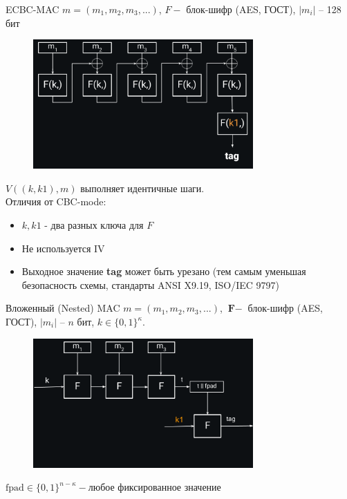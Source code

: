 \documentclass[usenames,dvipsnames,8pt,aspectratio=169]{beamer}
\begin{document}
\begin{frame}{ECBC-MAC }
\Large
 $m = (m_1, m_2, m_3, ...)$, $F-$ блок-шифр (AES, ГОСТ), $|m_i|$  --  128 бит
	\begin{figure}
		\includegraphics[width=0.75\textwidth]{CBC_MAC}
	\end{figure}
\vspace{-90pt}

\Large 
$V((k, k1), m)$ выполняет идентичные шаги.\\[10pt]

Отличия от CBC-mode:
\begin{itemize}
	\itemsep 5pt
	\item $k, k1$ - два {\color{Orange} разных} ключа для $F $
	\item Не используется IV
	\item Выходное значение \textbf{tag} может быть урезано (тем самым уменьшая безопасность схемы, стандарты ANSI X9.19, ISO/IEC 9797)
\end{itemize}

\end{frame}


\begin{frame}{Вложенный (Nested) MAC}
	\Large
	\vspace{-25pt}
	$m = (m_1, m_2, m_3, ...)$, $\textbf{F}-$ блок-шифр (AES, ГОСТ), $|m_i|$ -- $n$ бит, $k  \in \{0,1\}^\kappa$.
	\begin{figure}
		\includegraphics[width=0.75\textwidth]{NMAC}
	\end{figure}
\vspace{-40pt}
$
	\text{fpad} \in \{0,1\}^{n - \kappa} -\text{любое фиксированное значение}
$
\end{frame}
\end{document}
